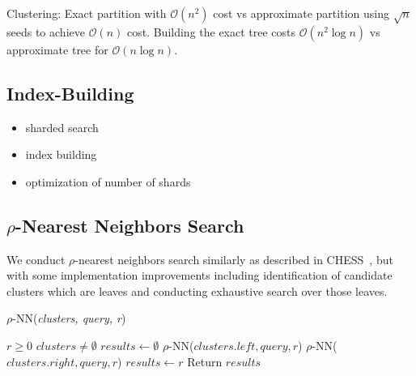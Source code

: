 Clustering: Exact partition with $\mathcal{O}(n^2)$ cost vs approximate partition using $\sqrt{n}$ seeds to achieve $\mathcal{O}(n)$ cost.
Building the exact tree costs $\mathcal{O}(n^2 \log n)$ vs approximate tree for $\mathcal{O}(n \log n)$.


\subsection {Index-Building}
\begin{itemize}
    \item sharded search 
    \item index building 
    \item optimization of number of shards 
\end{itemize}

\subsection{\texorpdfstring{$\rho$}{p}-Nearest Neighbors Search}
\label{subsec:methods:rnn-search}

We conduct $\rho$-nearest neighbors search similarly as described in CHESS~\cite{ishaq2019clustered}, but 
with some implementation improvements including identification of candidate clusters which are leaves and 
conducting exhaustive search over those leaves.

\begin{algorithm} 
    \caption{$\rho$-NN(\emph{clusters, query, r})} 
    \label{alg:rnn} 
    \begin{algorithmic}[2]
        \REQUIRE $r \geq 0$
        \REQUIRE $clusters \neq \emptyset$
        \STATE $results \leftarrow \emptyset$
                \STATE $\rho$-NN($clusters.left, query, r$)
            \ENDIF
        \ENDIF
                \STATE $\rho$-NN($clusters.right, query, r$)
            \ENDIF
        \ENDIF
                    \STATE $results \leftarrow r$
                \ENDIF
            \ENDFOR
        \ENDIF
        \STATE Return $results$
    \end{algorithmic}
    \end{algorithm}

